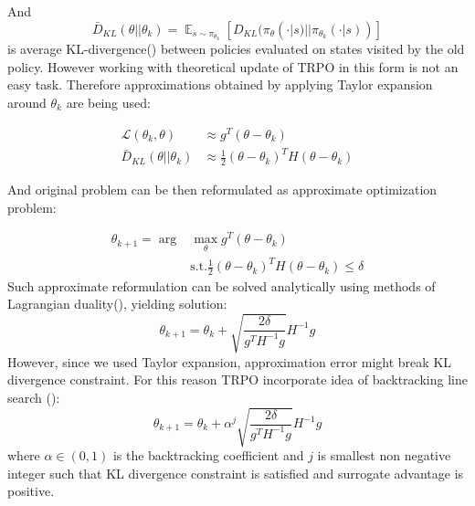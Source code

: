 And \[\bar{D}_{KL}(\theta||\theta_k) = \mathop{\mathbb{E}}_{s \sim \pi_{\theta_k}}[D_{KL}(\pi_\theta(\cdot|s)||\pi_{\theta_k}(\cdot|s))]\] is average KL-divergence(\cite{KLDIV}) between policies evaluated on states visited by the old policy.
However working with theoretical update of TRPO in this form is not an easy task. 
Therefore approximations obtained by applying Taylor expansion around $\theta_k$ are being used:

\begin{align*}
  \mathcal{L}(\theta_k,\theta) &\approx g^T(\theta - \theta_k) \\
  \bar{D}_{KL}(\theta||\theta_k) &\approx \frac{1}{2} (\theta-\theta_k)^TH(\theta-\theta_k)
\end{align*}

And original problem can be then reformulated as approximate optimization problem:

\begin{align*}
  \theta_{k+1} = \arg &\max_\theta g^T(\theta - \theta_k)   \\  
  &\text{s.t.}  \frac{1}{2} (\theta-\theta_k)^TH(\theta-\theta_k) \leq \delta
\end{align*}
Such approximate reformulation can be solved analytically using methods of Lagrangian duality(\cite{LagrangDuality}), yielding solution:
\[\theta_{k+1} = \theta_k + \sqrt{\frac{2\delta}{g^TH^{-1}g}}H^{-1}g\]
However, since we used Taylor expansion, approximation error might break KL divergence constraint.
For this reason TRPO incorporate idea of backtracking line search (\cite{BacktrackingLineSearch}):
\[\theta_{k+1} = \theta_k + \alpha^j \sqrt{\frac{2\delta}{g^TH^{-1}g}}H^{-1}g\]
where $\alpha \in (0,1)$ is the backtracking coefficient and $j$ is smallest non negative integer such that KL divergence constraint is satisfied and surrogate advantage is positive.



